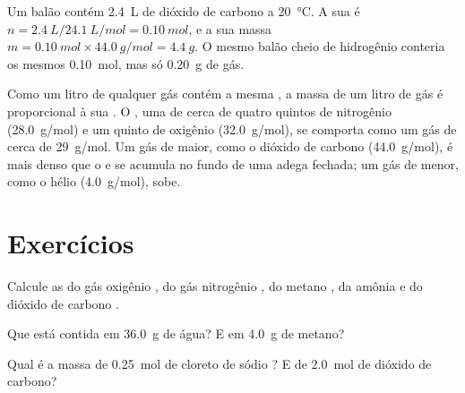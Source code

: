 \begin{example}\label{ex:g10:the-mole:balloon}
Um balão contém \qty{2.4}{L} de dióxido de carbono a \qty{20}{\celsius}.
A sua  é
$n = \qty{2.4}{L} / \qty{24.1}{L/mol} = \qty{0.10}{mol}$,
e a sua massa $m = \qty{0.10}{mol} \times \qty{44.0}{g/mol} =
\qty{4.4}{g}$. O mesmo balão cheio de hidrogênio conteria os mesmos
\qty{0.10}{mol}, mas só \qty{0.20}{g} de gás.
\end{example}

\begin{remark}\label{rem:g10:the-mole:heavy}
Como um litro de qualquer gás contém a mesma , a
massa de um litro de gás é proporcional à sua . O , uma
 de cerca de quatro quintos de nitrogênio (\qty{28.0}{g/mol}) e
um quinto de oxigênio (\qty{32.0}{g/mol}), se comporta como um gás de
 cerca de \qty{29}{g/mol}. Um gás de  maior, como
o dióxido de carbono (\qty{44.0}{g/mol}), é mais denso que o  e se
acumula no fundo de uma adega fechada; um gás de  menor, como
o hélio (\qty{4.0}{g/mol}), sobe.
\end{remark}

\section{Exercícios}

\begin{exercise}[$\star$]\label{exo:g10:the-mole:1}
Calcule as  do gás oxigênio , do gás nitrogênio
, do metano , da amônia  e do dióxido de carbono
.
\end{exercise}

\begin{exercise}[$\star$]\label{exo:g10:the-mole:2}
Que  está contida em \qty{36.0}{g} de água? E em
\qty{4.0}{g} de metano?
\end{exercise}

\begin{exercise}[$\star$]\label{exo:g10:the-mole:3}
Qual é a massa de \qty{0.25}{mol} de cloreto de sódio ? E de
\qty{2.0}{mol} de dióxido de carbono?
\end{exercise}

